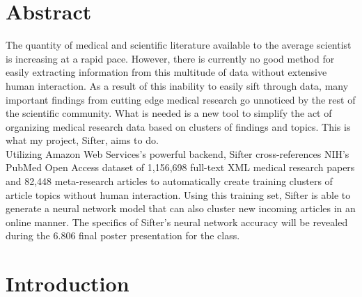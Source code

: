 \documentclass[12pt,twoside]{article}
\begin{document}


\section{Abstract}

The quantity of medical and scientific literature available to the average scientist is increasing at a rapid pace. However, there is currently no good method for easily extracting information from this multitude of data without extensive human interaction. As a result of this inability to easily sift through data, many important findings from cutting edge medical research go unnoticed by the rest of the scientific community. What is needed is a new tool to simplify the act of organizing medical research data based on clusters of findings and topics. This is what my project, Sifter, aims to do.\\

Utilizing Amazon Web Services's powerful backend, Sifter cross-references NIH's PubMed Open Access dataset of 1,156,698 full-text XML medical research papers and 82,448 meta-research articles to automatically create training clusters of article topics without human interaction. Using this training set, Sifter is able to generate a neural network model that can also cluster new incoming articles in an online manner. The specifics of Sifter's neural network accuracy will be revealed during the 6.806 final poster presentation for the class.

\section{Introduction}
\end{document}
